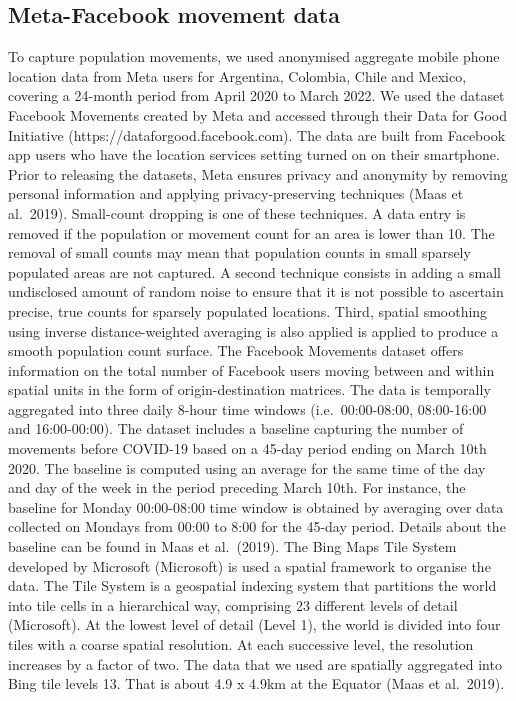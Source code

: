 \documentclass[
  11pt,
]{article}
\begin{document}
\subsection{Meta-Facebook movement
data}\label{meta-facebook-movement-data}

To capture population movements, we used anonymised aggregate mobile
phone location data from Meta users for Argentina, Colombia, Chile and
Mexico, covering a 24-month period from April 2020 to March 2022. We
used the dataset Facebook Movements created by Meta and accessed through
their Data for Good Initiative (https://dataforgood.facebook.com). The
data are built from Facebook app users who have the location services
setting turned on on their smartphone. Prior to releasing the datasets,
Meta ensures privacy and anonymity by removing personal information and
applying privacy-preserving techniques (Maas et al.~2019). Small-count
dropping is one of these techniques. A data entry is removed if the
population or movement count for an area is lower than 10. The removal
of small counts may mean that population counts in small sparsely
populated areas are not captured. A second technique consists in adding
a small undisclosed amount of random noise to ensure that it is not
possible to ascertain precise, true counts for sparsely populated
locations. Third, spatial smoothing using inverse distance-weighted
averaging is also applied is applied to produce a smooth population
count surface. The Facebook Movements dataset offers information on the
total number of Facebook users moving between and within spatial units
in the form of origin-destination matrices. The data is temporally
aggregated into three daily 8-hour time windows (i.e.~00:00-08:00,
08:00-16:00 and 16:00-00:00). The dataset includes a baseline capturing
the number of movements before COVID-19 based on a 45-day period ending
on March 10th 2020. The baseline is computed using an average for the
same time of the day and day of the week in the period preceding March
10th. For instance, the baseline for Monday 00:00-08:00 time window is
obtained by averaging over data collected on Mondays from 00:00 to 8:00
for the 45-day period. Details about the baseline can be found in Maas
et al.~(2019). The Bing Maps Tile System developed by Microsoft
(Microsoft) is used a spatial framework to organise the data. The Tile
System is a geospatial indexing system that partitions the world into
tile cells in a hierarchical way, comprising 23 different levels of
detail (Microsoft). At the lowest level of detail (Level 1), the world
is divided into four tiles with a coarse spatial resolution. At each
successive level, the resolution increases by a factor of two. The data
that we used are spatially aggregated into Bing tile levels 13. That is
about 4.9 x 4.9km at the Equator (Maas et al.~2019).
\end{document}
